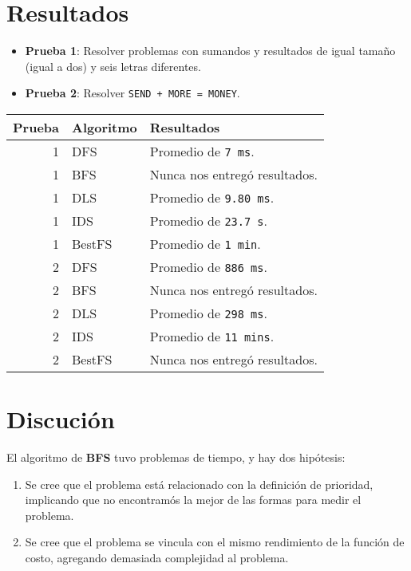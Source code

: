 \documentclass[11pt]{article}
\begin{document}
\section{Resultados}
\label{sec:org621468d}

\begin{itemize}
\item \textbf{\textbf{Prueba 1}}: Resolver problemas con sumandos y resultados de igual tamaño (igual a dos) y seis letras diferentes.
\item \textbf{\textbf{Prueba 2}}: Resolver \texttt{SEND + MORE = MONEY}.
\end{itemize}

\begin{center}
\begin{tabular}{rll}
\textbf{\textbf{Prueba}} & \textbf{\textbf{Algoritmo}} & \textbf{\textbf{Resultados}}\\
\hline
1 & DFS & Promedio de \texttt{7 ms}.\\
1 & BFS & Nunca nos entregó resultados.\\
1 & DLS & Promedio de \texttt{9.80 ms}.\\
1 & IDS & Promedio de \texttt{23.7 s}.\\
1 & BestFS & Promedio de \texttt{1 min}.\\
\hline
2 & DFS & Promedio de \texttt{886 ms}.\\
2 & BFS & Nunca nos entregó resultados.\\
2 & DLS & Promedio de \texttt{298 ms}.\\
2 & IDS & Promedio de \texttt{11 mins}.\\
2 & BestFS & Nunca nos entregó resultados.\\
\hline
\end{tabular}
\end{center}

\section{Discución}
\label{sec:org7a3a307}

El algoritmo de \textbf{\textbf{BFS}} tuvo problemas de tiempo, y hay dos hipótesis:

\begin{enumerate}
\item Se cree que el problema está relacionado con la definición de prioridad, implicando que no encontramós la mejor de las formas para medir el problema.
\item Se cree que el problema se vincula con el mismo rendimiento de la función de costo, agregando demasiada complejidad al problema.
\end{enumerate}
\end{document}
